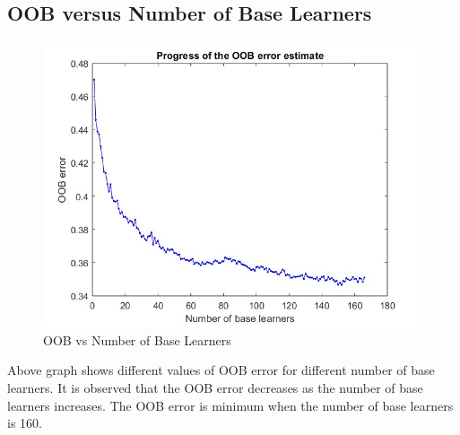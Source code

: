 \subsection{OOB versus Number of Base Learners}
\begin{figure}[H]
    \centering
    \includegraphics[width=120mm]{./img/2600/staturAATE2600.jpg}
    \caption{OOB vs Number of Base Learners}
\end{figure}
Above graph shows different values of OOB error for different number of base learners. It is observed that the OOB error decreases as the number of base learners increases. The OOB error is minimum when the number of base learners is 160.

